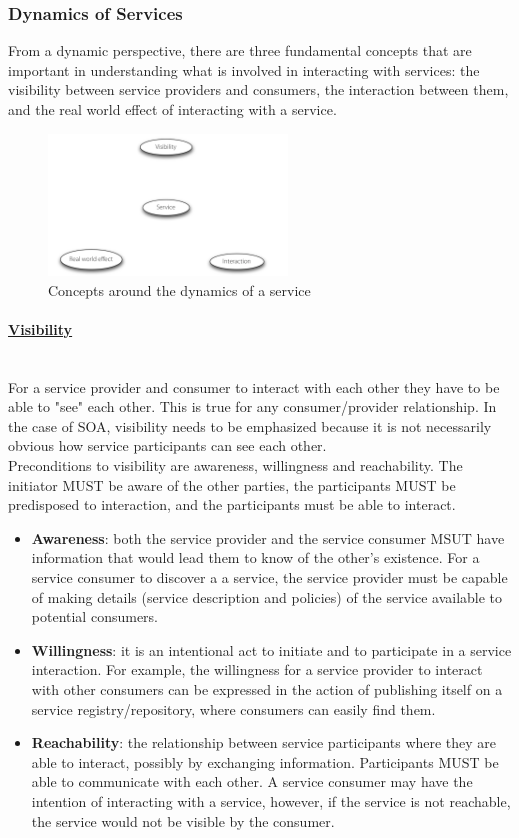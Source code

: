 \documentclass[10pt,a4paper]{article}
\newcommand{\myparagraph}[1]{\paragraph{\uline{#1}}\mbox{}\\[0.05in]}
\begin{document}
\subsubsection{Dynamics of Services}
From a dynamic perspective, there are three fundamental concepts that are important in understanding what is involved in interacting with services: the visibility between service providers and consumers, the interaction between them, and the real world effect of interacting with a service.
\begin{figure}[h!]
 \hfill \includegraphics[width=180pt]{images/dynamics-services}\hspace*{\fill}
  \caption{Concepts around the dynamics of a service}
  \label{fig:dynamics}
\end{figure} 
\myparagraph{Visibility}
 For a service provider and consumer to interact with each other they have to be able to "see" each other. This is true for any consumer/provider relationship. In the case of SOA, visibility needs to be emphasized because it is not necessarily obvious how service participants can see each other. \\
 Preconditions to visibility are awareness, willingness and reachability. The initiator MUST be aware of the other parties, the participants MUST be predisposed to interaction, and the participants must be able to interact.
 \begin{itemize}
 	\item \textbf{Awareness}: both the service provider and the service consumer MSUT have information that would lead them to know of the other's existence. For a service consumer to discover a a service, the service provider must be capable of making details (service description and policies) of the service available to potential consumers.
 	\item \textbf{Willingness}: it is an intentional act to initiate and to participate in a service interaction.  For example, the willingness for a service provider to interact with other consumers can be expressed in the action of publishing itself on a service registry/repository, where consumers can easily find them.
 	\item \textbf{Reachability}: the relationship between service participants where they are able to interact, possibly by exchanging information. Participants MUST be able to communicate with each other. A service consumer may have the intention of interacting with a service, however, if the service is not reachable, the service would not be visible by the consumer.
 \end{itemize}
\end{document}
